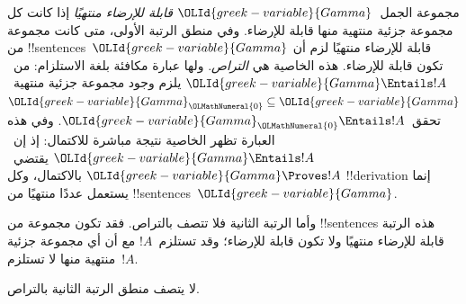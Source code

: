 \documentclass[../../../include/open-logic-section]{subfiles}
\begin{document}


\begin{explain}
مجموعة الجمل~${\OLId{greek-variable}{Gamma}}$ \emph{قابلة للإرضاء منتهيًا} إذا كانت
كل مجموعة جزئية منتهية منها قابلة للإرضاء.
وفي منطق الرتبة الأولى، متى كانت مجموعة من !!{sentence}s~${\OLId{greek-variable}{Gamma}}$
قابلة للإرضاء منتهيًا لزم أن تكون قابلة للإرضاء.
هذه الخاصية هي \emph{التراص}. ولها عبارة مكافئة بلغة الاستلزام:
من~${\OLId{greek-variable}{Gamma}} \Entails !A$ يلزم وجود مجموعة جزئية
منتهية~${\OLId{greek-variable}{Gamma}}_{\OLMathNumeral{0}} \subseteq {\OLId{greek-variable}{Gamma}}$ تحقق~${\OLId{greek-variable}{Gamma}}_{\OLMathNumeral{0}} \Entails !A$.
وفي هذه العبارة تظهر الخاصية نتيجة مباشرة للاكتمال:
إذ إن~${\OLId{greek-variable}{Gamma}} \Entails !A$ يقتضي~${\OLId{greek-variable}{Gamma}} \Proves !A$ بالاكتمال،
وكل !!{derivation} إنما يستعمل عددًا منتهيًا من
!!{sentence}s~${\OLId{greek-variable}{Gamma}}$.

وأما الرتبة الثانية فلا تتصف بالتراص. فقد تكون مجموعة من
!!{sentence}s هذه الرتبة قابلة للإرضاء منتهيًا ولا تكون قابلة
للإرضاء؛ وقد تستلزم~$!A$ مع أن أي مجموعة جزئية منتهية منها
لا تستلزم~$!A$.
\end{explain}

\begin{thm}
لا يتصف منطق الرتبة الثانية بالتراص.
\end{thm}
\end{document}
